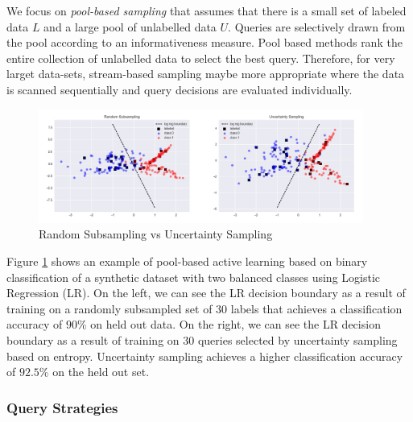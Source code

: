 We focus on \textit{pool-based sampling} that assumes that there is a small set of labeled data $L$ and a large pool of unlabelled data $U$. Queries are selectively drawn from the pool according to an informativeness measure. Pool based methods rank the entire collection of unlabelled data to select the best query. Therefore, for very larget data-sets, stream-based sampling maybe more appropriate where the data is scanned sequentially and query decisions are evaluated individually.\\

\begin{figure}[tbhp]
    \centering
    \includegraphics[width=0.95\textwidth, trim={10 10 10 10}]{figures/active_learning_logreg.png}
    \caption{Random Subsampling vs Uncertainty Sampling}
    \label{fig:al_logreg}
\end{figure}

Figure \ref{fig:al_logreg} shows an example of pool-based active learning based on binary classification of a synthetic dataset with two balanced classes using Logistic Regression (LR). On the left, we can see the LR decision boundary as a result of training on a randomly subsampled set of $30$ labels that achieves a classification accuracy of $90\%$ on held out data. On the right, we can see the LR decision boundary as a result of training on $30$ queries selected by uncertainty sampling based on entropy. Uncertainty sampling achieves a higher classification accuracy of $92.5\%$ on the held out set.   


\subsubsection{Query Strategies}

